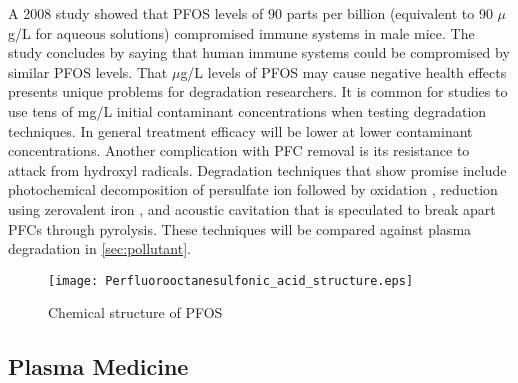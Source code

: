 A 2008 study showed that PFOS levels of 90 parts per billion (equivalent to 90 $\mu$g/L for aqueous solutions) compromised immune systems in male mice. \cite{betts2008chemical} The study concludes by saying that human immune systems could be compromised by similar PFOS levels. That $\mu$g/L levels of PFOS may cause negative health effects presents unique problems for degradation researchers. It is common for studies to use tens of mg/L initial contaminant concentrations when testing degradation techniques. In general treatment efficacy will be lower at lower contaminant concentrations. Another complication with PFC removal is its resistance to attack from hydroxyl radicals. Degradation techniques that show promise include photochemical decomposition of persulfate ion followed by oxidation \cite{hori2005efficient}, reduction using zerovalent iron \cite{hori2006efficient}, and acoustic cavitation that is speculated to break apart PFCs through pyrolysis. \cite{moriwaki2005sonochemical,cheng2008sonochemical} These techniques will be compared against plasma degradation in \cref{sec:pollutant}.

\begin{figure}[htbp]
  \centering
  \texttt{[image: Perfluorooctanesulfonic\_acid\_structure.eps]}
  \caption{Chemical structure of PFOS}
  \label{fig:PFOS_struct}
\end{figure}

\subsection{Plasma Medicine}

